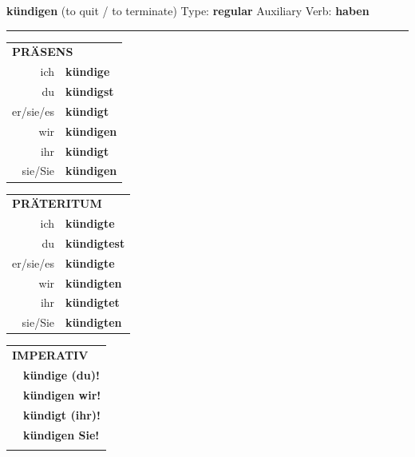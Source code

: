 \documentclass[10pt,a4paper]{revtex4-2}
\begin{document}
\begin{verbbox}
    {\Large \bf kündigen} (to quit / to terminate) \hfill Type: \textbf{regular} \hfill Auxiliary Verb: \textbf{haben} 
    
     \vspace{5pt}

    \hrule
    
    \vspace{5pt}

  \begin{tabular}{rl}
     \multicolumn{2}{l}{\textbf{PRÄSENS} }\\
    ich & \textbf{kündige}\\
    du & \textbf{kündigst}\\
    er/sie/es & \textbf{kündigt}\\
    wir & \textbf{kündigen}\\
    ihr & \textbf{kündigt}\\
    sie/Sie & \textbf{kündigen}\\
  \end{tabular}
  \hfill
     \begin{tabular}{rl}
    \multicolumn{2}{l}{\textbf{PRÄTERITUM} }\\
    ich & \textbf{kündigte}\\
    du & \textbf{kündigtest}\\
    er/sie/es & \textbf{kündigte}\\
    wir & \textbf{kündigten}\\
    ihr & \textbf{kündigtet}\\
    sie/Sie & \textbf{kündigten}\\
  \end{tabular}
  \hfill
  \begin{tabular}{rl}
     \multicolumn{2}{l}{\textbf{IMPERATIV} }\\
   & \textbf{kündige (du)!}\\
   & \textbf{kündigen wir!}\\
   & \textbf{kündigt (ihr)!}\\
   & \textbf{kündigen Sie!}\\
   & \vspace{10pt}
  \end{tabular}

    \vspace{10pt}


\end{verbbox}
\end{document}
